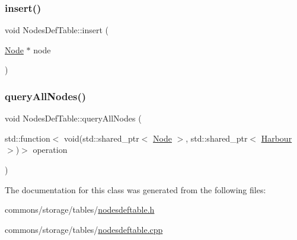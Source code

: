 \mbox{\label{class_nodes_def_table_a1089d94496f6d3bbeaee38de2fc34ff6}} 
\subsubsection{\texorpdfstring{insert()}{insert()}}
{\footnotesize\ttfamily void Nodes\+Def\+Table\+::insert (\begin{DoxyParamCaption}\item[{\mbox{\hyperlink{class_node}{Node}} $\ast$}]{node }\end{DoxyParamCaption})}

\mbox{\label{class_nodes_def_table_a41ee8c32c215441940c754622b7df030}} 
\subsubsection{\texorpdfstring{queryAllNodes()}{queryAllNodes()}}
{\footnotesize\ttfamily void Nodes\+Def\+Table\+::query\+All\+Nodes (\begin{DoxyParamCaption}\item[{std\+::function$<$ void(std\+::shared\+\_\+ptr$<$ \mbox{\hyperlink{class_node}{Node}} $>$, std\+::shared\+\_\+ptr$<$ \mbox{\hyperlink{class_harbour}{Harbour}} $>$)$>$}]{operation }\end{DoxyParamCaption})}



The documentation for this class was generated from the following files\+:\begin{DoxyCompactItemize}
\item 
commons/storage/tables/\mbox{\hyperlink{nodesdeftable_8h}{nodesdeftable.\+h}}\item 
commons/storage/tables/\mbox{\hyperlink{nodesdeftable_8cpp}{nodesdeftable.\+cpp}}\end{DoxyCompactItemize}
